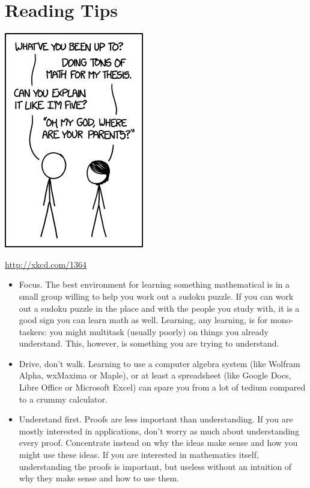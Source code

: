 \section*{Reading Tips}
\begin{marginfigure}
\begin{center}
\includegraphics{graphics/like_im_five.png}
\end{center}
\caption{\url{http://xkcd.com/1364}}
\label{fig:xkcd1364}
\end{marginfigure}
\begin{itemize}
\item Focus. The best environment for learning something mathematical is in a small group willing to help you work out a sudoku puzzle.  If you can work out a sudoku puzzle in the place and with the people you study with, it is a good sign you can learn math as well.  Learning, any learning, is for mono-taskers: you might multitask (usually poorly) on things you already understand.  This, however, is something you are trying to understand.
\item Drive, don't walk. Learning to use a computer algebra system (like Wolfram Alpha, wxMaxima or Maple), or at least a spreadsheet (like Google Docs, Libre Office or Microsoft Excel) can spare you from a lot of tedium compared to a crummy calculator.
\item Understand first. Proofs are less important than understanding.  If you are mostly interested in applications, don't worry as much about understanding every proof.  Concentrate instead on why the ideas make sense and how you might use these ideas.  If you are interested in mathematics itself, understanding the proofs is important, but useless without an intuition of why they make sense and how to use them.
\end{itemize}
